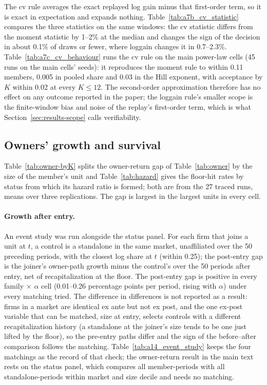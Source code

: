 The cv rule averages the exact replayed log gain minus that first-order term, so it is exact in expectation and expands nothing. Table~\ref{tab:a7b_cv_statistic} compares the three statistics on the same windows: the cv statistic differs from the moment statistic by 1--2\% at the median and changes the sign of the decision in about 0.1\% of draws or fewer, where loggain changes it in 0.7--2.3\%. Table~\ref{tab:a7c_cv_behaviour} runs the cv rule on the main power-law cells (45 runs on the main cells' seeds): it reproduces the moment rule to within 0.11 members, 0.005 in pooled share and 0.03 in the Hill exponent, with acceptance by $K$ within 0.02 at every $K \leq 12$. The second-order approximation therefore has no effect on any outcome reported in the paper; the loggain rule's smaller scope is the finite-window bias and noise of the replay's first-order term, which is what Section~\ref{sec:results-scope} calls verifiability.





\subsection{Owners' growth and survival}\label{app:owners}

Table~\ref{tab:owner-byK} splits the owner-return gap of Table~\ref{tab:owner} by the size of the member's unit and Table~\ref{tab:hazard} gives the floor-hit rates by status from which its hazard ratio is formed; both are from the 27 traced runs, means over three replications. The gap is largest in the largest units in every cell.




\paragraph*{Growth after entry.}\label{app:eventstudy}
An event study was run alongside the status panel. For each firm that joins a unit at $t$, a control is a standalone in the same market, unaffiliated over the 50 preceding periods, with the closest log share at $t$ (within 0.25); the post-entry gap is the joiner's owner-path growth minus the control's over the 50 periods after entry, net of recapitalization at the floor. The post-entry gap is positive in every family $\times$ $\alpha$ cell (0.01--0.26 percentage points per period, rising with $\alpha$) under every matching tried. The difference in differences is not reported as a result: firms in a market are identical ex ante but not ex post, and the one ex-post variable that can be matched, size at entry, selects controls with a different recapitalization history (a standalone at the joiner's size tends to be one just lifted by the floor), so the pre-entry paths differ and the sign of the before--after comparison follows the matching. Table~\ref{tab:a14_event_study} keeps the four matchings as the record of that check; the owner-return result in the main text rests on the status panel, which compares all member-periods with all standalone-periods within market and size decile and needs no matching.

